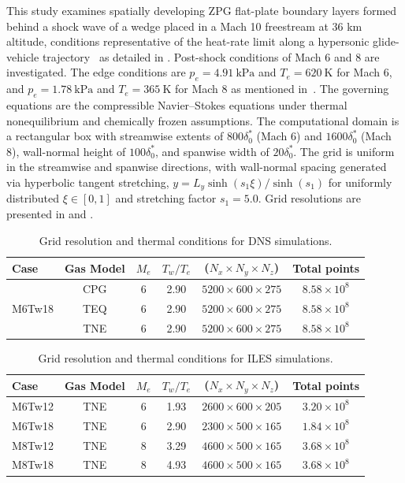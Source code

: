 This study examines spatially developing \gls{ZPG} flat-plate boundary layers formed behind a shock wave of a wedge placed in a Mach 10 freestream at 36 km altitude, conditions representative of the heat-rate limit along a hypersonic glide-vehicle trajectory~\citep{Rizvi2015} as detailed in . Post-shock conditions of Mach 6 and 8 are investigated. The edge conditions are $p_e = 4.91~\mathrm{kPa}$ and $T_e = 620~\mathrm{K}$ for Mach 6, and $p_e = 1.78~\mathrm{kPa}$ and $T_e = 365~\mathrm{K}$ for Mach 8 as mentioned in~. The governing equations are the compressible Navier--Stokes equations under thermal nonequilibrium and chemically frozen assumptions. The computational domain is a rectangular box with streamwise extents of $800\delta^*_0$ (Mach 6) and $1600\delta^*_0$ (Mach 8), wall-normal height of $100\delta^*_0$, and spanwise width of $20\delta^*_0$. The grid is uniform in the streamwise and spanwise directions, with wall-normal spacing generated via hyperbolic tangent stretching, $y = L_y \sinh(s_1 \xi)/\sinh(s_1)$ for uniformly distributed $\xi \in [0,1]$ and stretching factor $s_1 = 5.0$. Grid resolutions are presented in  and .

\begin{table}[hbt!]
\centering
\caption{Grid resolution and thermal conditions for DNS simulations.}
\begin{tabular}{lccccc}
\toprule
Case & Gas Model & $M_e$ & $T_w/T_e$ &  ($N_x \times N_y \times N_z$) & Total points \\
\midrule
\multirow{3}{*}{M6Tw18} & CPG & 6 & 2.90 & $5200 \times 600 \times 275$ & $8.58\times 10^8$ \\
 & TEQ & 6 & 2.90 & $5200 \times 600 \times 275$ & $8.58\times 10^8$ \\
 & TNE & 6 & 2.90 & $5200 \times 600 \times 275$ & $8.58\times 10^8$ \\
\bottomrule
\end{tabular}
\label{tab:domain_grid_dns}
\end{table}
\begin{table}[hbt!]
\centering
\caption{Grid resolution and thermal conditions for ILES simulations.}
\begin{tabular}{lccccc}
\toprule
Case & Gas Model & $M_e$ & $T_w/T_e$ &  ($N_x \times N_y \times N_z$) & Total points \\
\midrule
M6Tw12 & TNE & 6 & 1.93 & $2600 \times 600 \times 205$ & $3.20\times 10^8$ \\
M6Tw18 & TNE & 6 & 2.90 & $2300 \times 500 \times 165$ & $1.84\times 10^8$ \\
M8Tw12 & TNE & 8 & 3.29 & $4600 \times 500 \times 165$ & $3.68\times 10^8$ \\
M8Tw18 & TNE & 8 & 4.93 & $4600 \times 500 \times 165$ & $3.68\times 10^8$ \\
\bottomrule
\end{tabular}
\label{tab:domain_grid_iles}
\end{table}

